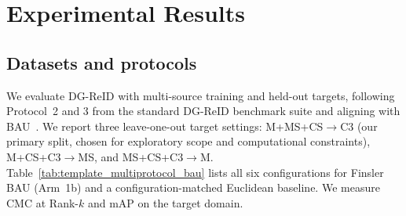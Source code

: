 \section{Experimental Results} \label{sec:experimentalResults}
\subsection{Datasets and protocols} \label{subsec:datasets_protocols} \label{subsec:datasets_and_protocols}
We evaluate DG-ReID with multi-source training and held-out targets, following Protocol~2 and 3 from the standard DG-ReID benchmark suite and aligning with BAU~\cite{cho2024generalizable}. We report three leave-one-out target settings: M+MS+CS$\rightarrow$C3 (our primary split, chosen for exploratory scope and computational constraints), M+CS+C3$\rightarrow$MS, and MS+CS+C3$\rightarrow$M. Table~\ref{tab:template_multiprotocol_bau} lists all six configurations for Finsler BAU (Arm~1b) and a configuration-matched Euclidean baseline. We measure CMC at Rank-$k$ and mAP on the target domain.


\begin{table}[t]
  \centering
  \caption{Dataset statistics and abbreviation for the four datasets used in Protocol~2/3. Train/test splits follow the new-protocol convention for CUHK03~\cite{zhong2017re}.}
  \label{tab:dataset_stats}
\end{table}
  
